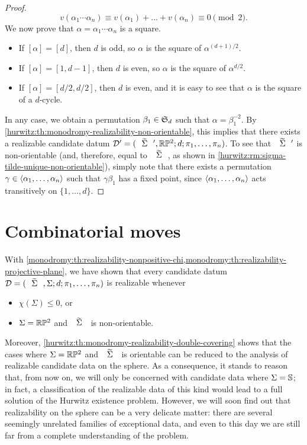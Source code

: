 \begin{proof}
\[
v(\alpha_1\cdots\alpha_n)\equiv v(\alpha_1)+\ldots+v(\alpha_n)\equiv 0\pmod{2}.
\]
We now prove that $\alpha=\alpha_1\cdots\alpha_n$ is a square.
\begin{itemize}
\item If $[\alpha]=[d]$, then $d$ is odd, so $\alpha$ is the square of $\alpha^{(d+1)/2}$.
\item If $[\alpha]=[1,d-1]$, then $d$ is even, so $\alpha$ is the square of $\alpha^{d/2}$.
\item If $[\alpha]=[d/2,d/2]$, then $d$ is even, and it is easy to see that $\alpha$ is the square of a $d$-cycle.
\end{itemize}
In any case, we obtain a permutation $\beta_1\in\symgroup[d]$ such that $\alpha=\beta_1^{-2}$. By \cref{hurwitz:th:monodromy-realizability-non-orientable}, this implies that there exists a realizable candidate datum $\DD'=\datum{\tSigma',\RP[2]}{d}{\pi_1,\ldots,\pi_n}$. To see that $\tSigma'$ is non-orientable (and, therefore, equal to $\tSigma$, as shown in \cref{hurwitz:rm:sigma-tilde-unique-non-orientable}), simply note that there exists a permutation $\gamma\in\left\langle\alpha_1,\ldots,\alpha_n\right\rangle$ such that $\gamma\beta_1$ has a fixed point, since $\left\langle\alpha_1,\ldots,\alpha_n\right\rangle$ acts transitively on $\{1,\ldots,d\}$.
\end{proof}

\section{Combinatorial moves}\label{monodromy:sc:combinatorial-moves}

With \cref{monodromy:th:realizability-nonpositive-chi,monodromy:th:realizability-projective-plane}, we have shown that every candidate datum $\DD=\datum{\tSigma,\Sigma}{d}{\pi_1,\ldots,\pi_n}$ is realizable whenever
\begin{itemize}
\item $\chi(\Sigma)\le 0$, or
\item $\Sigma=\RP[2]$ and $\tSigma$ is non-orientable.
\end{itemize}
Moreover, \cref{hurwitz:th:monodromy-realizability-double-covering} shows that the cases where $\Sigma=\RP[2]$ and $\tSigma$ is orientable can be reduced to the analysis of realizable candidate data on the sphere. As a consequence, it stands to reason that, from now on, we will only be concerned with candidate data where $\Sigma=\mathbb{S}{}$; in fact, a classification of the realizable data of this kind would lead to a full solution of the Hurwitz existence problem. However, we will soon find out that realizability on the sphere can be a very delicate matter: there are several seemingly unrelated families of exceptional data, and even to this day we are still far from a complete understanding of the problem.

